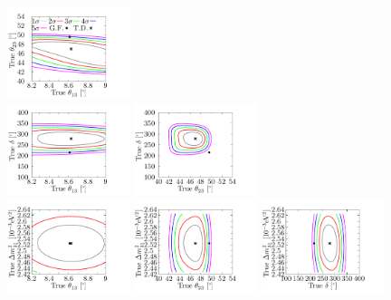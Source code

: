 \documentclass[aps,prd,nofootinbib,preprint]{revtex4}
\begin{document}
\begin{figure}[!h]
 \flushleft
%
\includegraphics[width=0.32\textwidth]{figs/SR_th13_th23.pdf}$~~~~~~$\\
\includegraphics[width=0.32\textwidth]{figs/SR_th13_dCP.pdf}
\includegraphics[width=0.32\textwidth]{figs/SR_th23_dCP.pdf}$~~~~~~$\\
\includegraphics[width=0.32\textwidth]{figs/SR_th13_ldm.pdf}
\includegraphics[width=0.32\textwidth]{figs/SR_th23_ldm.pdf}
\includegraphics[width=0.32\textwidth]{figs/SR_dCP_ldm.pdf}

\end{figure}
\end{document}
